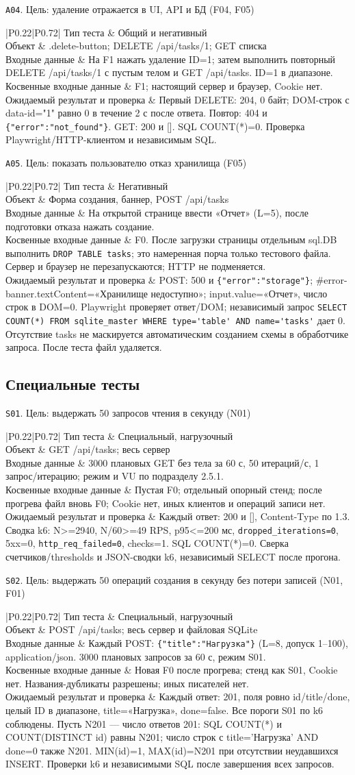 \documentclass[12pt,a4paper]{extarticle}
\newcommand{\code}[1]{\nolinkurl{#1}}
\newcommand{\rucode}[1]{\texttt{#1}}
\newcommand{\testcase}[6]{%
  \par\addvspace{12pt}\noindent #1\par\nopagebreak
  \begin{longtable}{|P{0.22\textwidth}|P{0.72\textwidth}|}
  \hline
  Тип теста & #2 \\ \hline
  Объект & #3 \\ \hline
  Входные данные & #4 \\ \hline
  Косвенные входные данные & #5 \\ \hline
  Ожидаемый результат и проверка & #6 \\ \hline
  \end{longtable}}
\begin{document}
\testcase{\texttt{A04}. Цель: удаление отражается в UI, API и БД (F04, F05)}
{Общий и негативный}
{.delete-button; DELETE /api/tasks/1; GET списка}
{На F1 нажать удаление ID=1; затем выполнить повторный
DELETE /api/tasks/1 с пустым телом и GET /api/tasks. ID=1 в диапазоне.}
{F1; настоящий сервер и браузер, Cookie нет.}
{Первый DELETE: 204, 0 байт; DOM-строк с data-id="1" равно 0
в течение 2 с после ответа. Повтор: 404 и \rucode{\{"error":"not\_found"\}}.
GET: 200 и []. SQL COUNT(*)=0.
Проверка Playwright/HTTP-клиентом и независимым SQL.}

\testcase{\texttt{A05}. Цель: показать пользователю отказ хранилища (F05)}
{Негативный}
{Форма создания, баннер, POST /api/tasks}
{На открытой странице ввести «Отчет» (L=5),
после подготовки отказа нажать создание.}
{F0. После загрузки страницы отдельным sql.DB выполнить
\code{DROP TABLE tasks}; это намеренная порча только тестового файла.
Сервер и браузер не перезапускаются; HTTP не подменяется.}
{POST: 500 и \rucode{\{"error":"storage"\}};
\#error-banner.textContent=«Хранилище недоступно»;
input.value=«Отчет», число строк в DOM=0.
Playwright проверяет ответ/DOM; независимый запрос
\code{SELECT COUNT(*) FROM sqlite_master WHERE type='table' AND name='tasks'}
дает 0. Отсутствие tasks не маскируется автоматическим созданием
схемы в обработчике запроса. После теста файл удаляется.}

\subsection{Специальные тесты}
\testcase{\texttt{S01}. Цель: выдержать 50 запросов чтения в секунду (N01)}
{Специальный, нагрузочный}
{GET /api/tasks; весь сервер}
{3000 плановых GET без тела за 60 с, 50 итераций/с,
1 запрос/итерацию; режим и VU по подразделу 2.5.1.}
{Пустая F0; отдельный опорный стенд; после прогрева файл вновь F0;
Cookie нет, иных клиентов и операций записи нет.}
{Каждый ответ: 200 и [], Content-Type по 1.3.
Сводка k6: N>=2940, N/60>=49 RPS, p95<=200 мс,
\code{dropped_iterations=0}, 5xx=0, \code{http_req_failed=0}, checks=1.
SQL COUNT(*)=0. Сверка счетчиков/thresholds и JSON-сводки k6,
независимый SELECT после прогона.}

\testcase{\texttt{S02}. Цель: выдержать 50 операций создания в секунду без потери записей (N01, F01)}
{Специальный, нагрузочный}
{POST /api/tasks; весь сервер и файловая SQLite}
{Каждый POST: \rucode{\{"title":"Нагрузка"\}} (L=8, допуск 1--100),
application/json. 3000 плановых запросов за 60 с, режим S01.}
{Новая F0 после прогрева; стенд как S01, Cookie нет.
Названия-дубликаты разрешены; иных писателей нет.}
{Каждый ответ: 201, поля ровно id/title/done,
целый ID в диапазоне, title=«Нагрузка», done=false.
Все пороги S01 по k6 соблюдены.
Пусть N201 --- число ответов 201: SQL COUNT(*) и COUNT(DISTINCT id)
равны N201; число строк с title='Нагрузка' AND done=0 также N201.
MIN(id)=1, MAX(id)=N201 при отсутствии неудавшихся INSERT.
Проверки k6 и независимыми SQL после завершения всех запросов.}
\end{document}
